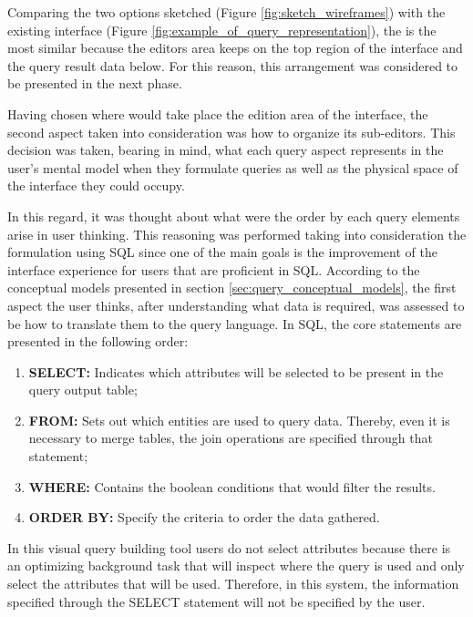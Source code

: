Comparing the two options sketched (Figure \ref{fig:sketch_wireframes}) with the existing interface (Figure \ref{fig:example_of_query_representation}), the  is the most similar because the editors area keeps on the top region of the interface and the query result data below. For this reason, this arrangement was considered to be presented in the next phase.

Having chosen where would take place the edition area of the interface, the second aspect taken into consideration was how to organize its sub-editors. This decision was taken, bearing in mind, what each query aspect represents in the user's mental model when they formulate queries as well as the physical space of the interface they could occupy.

In this regard, it was thought about what were the order by each query elements arise in user thinking. This reasoning was performed taking into consideration the formulation using \gls{SQL} since one of the main goals is the improvement of the interface experience for users that are proficient in \gls{SQL}. According to the conceptual models presented in section \ref{sec:query_conceptual_models}, the first aspect the user thinks, after understanding what data is required, was assessed to be how to translate them to the query language. In \gls{SQL}, the core statements are presented in the following order:

\begin{enumerate}
  \item \textbf{SELECT: }Indicates which attributes will be selected to be present in the query output table;
  \item \textbf{FROM: }Sets out which entities are used to query data. Thereby, even it is necessary to merge tables, the join operations are specified through that statement;
  \item \textbf{WHERE: }Contains the boolean conditions that would filter the results.
  \item \textbf{ORDER BY: }Specify the criteria to order the data gathered.
\end{enumerate}

In this visual query building tool users do not select attributes because there is an optimizing background task that will inspect where the query is used and only select the attributes that will be used. Therefore, in this system, the information specified through the SELECT statement will not be specified by the user.

